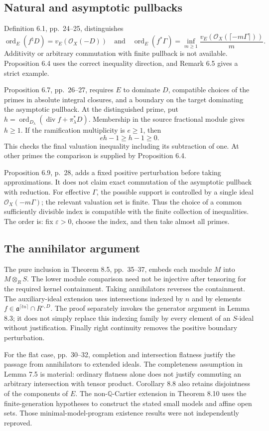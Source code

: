 \documentclass[10pt]{article}
\begin{document}
\subsection*{Natural and asymptotic pullbacks}
Definition 6.1, pp. 24–25, distinguishes \[\operatorname{ord}_E(f^\natural D)=v_E(\mathcal O_X(-D))
 \quad\text{and}\quad
 \operatorname{ord}_E(f^*\Gamma)
   =\inf_{m\geq1}\frac{v_E(\mathcal O_X(\lceil-m\Gamma\rceil))}{m}.\] Additivity or arbitrary commutation with finite pullback is not available. Proposition 6.4 uses the correct inequality direction, and Remark 6.5 gives a strict example.\par
Proposition 6.7, pp. 26–27, requires \(E\) to dominate \(D\), compatible choices of the primes in absolute integral closures, and a boundary on the target dominating the asymptotic pullback. At the distinguished prime, put \(h=\operatorname{ord}_{D_\lambda}
(\operatorname{div}f+\pi_\lambda^*D)\). Membership in the source fractional module gives \(h\geq1\). If the ramification multiplicity is \(e\geq1\), then \[eh-1\geq h-1\geq0.\] This checks the final valuation inequality including its subtraction of one. At other primes the comparison is supplied by Proposition 6.4.\par
Proposition 6.9, p. 28, adds a fixed positive perturbation before taking approximations. It does not claim exact commutation of the asymptotic pullback with reduction. For effective \(\Gamma\), the possible support is controlled by a single ideal \(\mathcal O_X(-m\Gamma)\); the relevant valuation set is finite. Thus the choice of a common sufficiently divisible index is compatible with the finite collection of inequalities. The order is: fix \(\varepsilon>0\), choose the index, and then take almost all primes.\par
\subsection*{The annihilator argument}
The pure inclusion in Theorem 8.5, pp. 35–37, embeds each module \(M\) into \(M\otimes_RS\). The lower module comparison need not be injective after tensoring for the required kernel containment. Taking annihilators reverses the containment. The auxiliary-ideal extension uses intersections indexed by \(n\) and by elements \(f\in\mathfrak a^{\lceil tn\rceil}\cap R^{\circ,D}\). The proof separately invokes the generator argument in Lemma 8.3; it does not simply replace this indexing family by every element of an \(S\)-ideal without justification. Finally right continuity removes the positive boundary perturbation.\par
For the flat case, pp. 30–32, completion and intersection flatness justify the passage from annihilators to extended ideals. The completeness assumption in Lemma 7.5 is material: ordinary flatness alone does not justify commuting an arbitrary intersection with tensor product. Corollary 8.8 also retains disjointness of the components of \(E\). The non-\(\mathbb Q\)-Cartier extension in Theorem 8.10 uses the finite-generation hypotheses to construct the stated small models and affine open sets. Those minimal-model-program existence results were not independently reproved.\par
\end{document}
